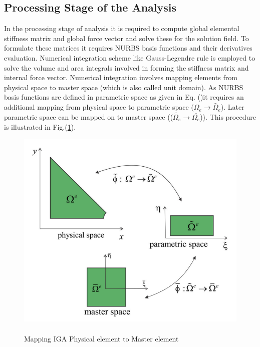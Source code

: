\documentclass[12pt]{article}
\begin{document}
\subsection{Processing Stage of the Analysis}
In the processing stage of analysis it is required to compute global elemental stiffness matrix and global force vector and solve these for the solution field. To formulate these matrices it requires NURBS basis functions and their derivatives evaluation. Numerical integration scheme like Gauss-Legendre rule is employed to solve the volume and area integrals involved in forming the stiffness matrix and internal force vector. Numerical integration involves mapping elements from physical space to master space (which is also called unit domain). As NURBS basis functions are defined in parametric space as given in Eq. ()it requires an additional mapping from physical space to parametric space ($\Omega_e \rightarrow \widetilde{\Omega_e}$). Later parametric space can be mapped on to master space (($\widetilde{\Omega_e} \rightarrow \overline{\Omega_e}$)). This procedure is illustrated in Fig.(\ref{MasterPhysical}).
\begin{figure}[H]
	\begin{center}
		\includegraphics[scale=0.3]{Physical_Master.png} 
		\caption{\\Mapping IGA Physical element to Master element}\label{MasterPhysical}
	\end{center}	
\end{figure}
\end{document}
